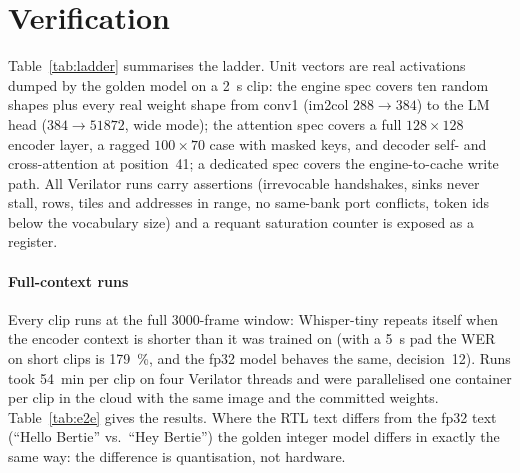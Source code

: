 \documentclass[conference]{IEEEtran}
\begin{document}
\section{Verification}\label{sec:verif}
\begin{table}[t]
\caption{The verification ladder. Every level is bit-exact against the golden model.}
\label{tab:ladder}
\centering\small
{}
\end{table}

Table~\ref{tab:ladder} summarises the ladder. Unit vectors are real activations dumped by the golden model on a \SI{2}{s} clip: the engine spec covers ten random shapes plus every real weight shape from conv1 (im2col $288\to384$) to the LM head ($384\to51872$, wide mode); the attention spec covers a full $128\times128$ encoder layer, a ragged $100\times70$ case with masked keys, and decoder self- and cross-attention at position~41; a dedicated spec covers the engine-to-cache write path. All Verilator runs carry assertions (irrevocable handshakes, sinks never stall, rows, tiles and addresses in range, no same-bank port conflicts, token ids below the vocabulary size) and a requant saturation counter is exposed as a register.

\paragraph{Full-context runs} Every clip runs at the full 3000-frame window: Whisper-tiny repeats itself when the encoder context is shorter than it was trained on (with a \SI{5}{s} pad the WER on short clips is \SI{179}{\percent}, and the fp32 model behaves the same, decision~12). Runs took \SI{54}{min} per clip on four Verilator threads and were parallelised one container per clip in the cloud with the same image and the committed weights. Table~\ref{tab:e2e} gives the results. Where the RTL text differs from the fp32 text (``Hello Bertie'' vs.\ ``Hey Bertie'') the golden integer model differs in exactly the same way: the difference is quantisation, not hardware.
\end{document}
